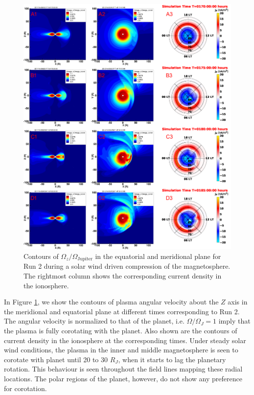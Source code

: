\begin{figure}
    \centering
    \includegraphics[width=\textwidth]{images3/combined_corotation_change.png}
    \caption{Contours of $\Omega_z/\Omega_\text{Jupiter}$ in the equatorial and meridional plane for Run 2 during a solar wind driven compression of the magnetosphere. The rightmost column shows the corresponding current density in the ionosphere.}
    \label{fig:combined-corotation-change}
\end{figure}

In Figure \ref{fig:combined-corotation-change}, we show the contours of plasma angular velocity about the $Z$ axis in the meridional and equatorial plane at different times corresponding to Run 2. The angular velocity is normalized to that of the planet, i.e. $\Omega/\Omega_J=1$ imply that the plasma is fully corotating with the planet. Also shown are the contours of current density in the ionosphere at the corresponding times. Under steady solar wind conditions, the plasma in the inner and middle magnetosphere is seen to corotate with planet until 20 to 30 $R_J$, when it starts to lag the planetary rotation. This behaviour is seen throughout the field lines mapping these radial locations. The polar regions of the planet, however, do not show any preference for corotation.

